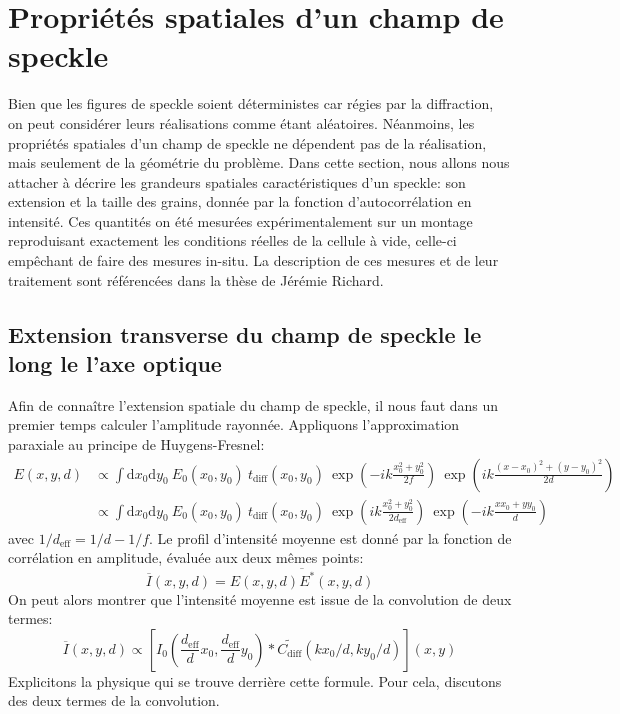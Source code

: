 \section{Propriétés spatiales d'un champ de speckle}
\label{sc:speckle_correlation}
Bien que les figures de speckle soient déterministes car régies par la diffraction, on peut considérer leurs réalisations comme étant aléatoires. Néanmoins, les propriétés spatiales d'un champ de speckle ne dépendent pas de la réalisation, mais seulement de la géométrie du problème. Dans cette section, nous allons nous attacher à décrire les grandeurs spatiales caractéristiques d'un speckle: son extension et la taille des grains, donnée par la fonction d'autocorrélation en intensité. Ces quantités on été mesurées expérimentalement sur un montage reproduisant exactement les conditions réelles de la cellule à vide, celle-ci empêchant de faire des mesures in-situ. La description de ces mesures et de leur traitement sont référencées dans la thèse de Jérémie Richard.

\subsection{Extension transverse du champ de speckle le long le l'axe optique}
Afin de connaître l'extension spatiale du champ de speckle, il nous faut dans un premier temps calculer l'amplitude rayonnée. Appliquons l'approximation paraxiale au principe de Huygens-Fresnel:
\begin{align}
E(x,y,d)&\propto \int{\mathrm{d}x_0 \mathrm{d}y_0 \: E_0(x_0,y_0) \: t_{\mathrm{diff}}(x_0,y_0) \: \exp{\left( -ik\frac{x_0^2+y_0^2}{2f} \right) } \: \exp{ \left( ik\frac{(x-x_0)^2+(y-y_0)^2}{2d} \right) }} \\
&\propto \int{\mathrm{d}x_0 \mathrm{d}y_0 \: E_0(x_0,y_0) \: t_{\mathrm{diff}}(x_0,y_0) \: \exp{\left( ik\frac{x_0^2+y_0^2}{2d_{\mathrm{eff}}} \right) } \: \exp{\left( -ik \frac{xx_0+yy_0}{d} \right) }}
\end{align}
avec $1/d_{\mathrm{eff}}=1/d-1/f$. Le profil d'intensité moyenne est donné par la fonction de corrélation en amplitude, évaluée aux deux mêmes points:
\begin{equation}
\overline{I}(x,y,d)=\overline{E(x,y,d)E^*(x,y,d)}
\end{equation}
On peut alors montrer que l'intensité moyenne est issue de la convolution de deux termes:
\begin{equation}
\overline{I}(x,y,d)\propto \left[ I_0(\frac{d_{\mathrm{eff}}}{d}x_0,\frac{d_{\mathrm{eff}}}{d}y_0) \ast \widetilde{C_{\mathrm{diff}}}(kx_0/d,ky_0/d) \right] (x,y)
\end{equation}
Explicitons la physique qui se trouve derrière cette formule. Pour cela, discutons des deux termes de la convolution. 


